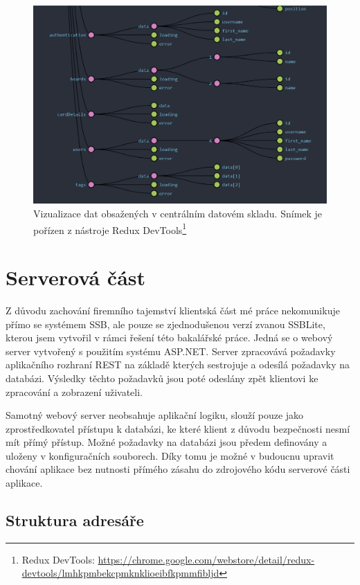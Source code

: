 \begin{figure}[H]
	\centering
	\label{img:ngrx-devtools}
	\includegraphics[width=\textwidth]{obrazky-figures/ngrx-chart.png}
	\caption{Vizualizace dat obsažených v centrálním datovém skladu. Snímek je pořízen z nástroje Redux DevTools\footnote{Redux DevTools: \url{https://chrome.google.com/webstore/detail/redux-devtools/lmhkpmbekcpmknklioeibfkpmmfibljd}}}
\end{figure}



\section{Serverová část}
Z důvodu zachování firemního tajemství klientská část mé práce nekomunikuje přímo se systémem SSB, ale pouze se zjednodušenou verzí zvanou SSBLite, kterou jsem vytvořil v rámci řešení této bakalářské práce. Jedná se o webový server vytvořený s použitím systému ASP.NET. Server zpracovává požadavky aplikačního rozhraní REST na základě kterých sestrojuje a odesílá požadavky na databázi. Výsledky těchto požadavků jsou poté odeslány zpět klientovi ke zpracování a zobrazení uživateli.

Samotný webový server neobsahuje aplikační logiku, slouží pouze jako zprostředkovatel přístupu k databázi, ke které klient z důvodu bezpečnosti nesmí mít přímý přístup. Možné požadavky na databázi jsou předem definovány a uloženy v konfiguračních souborech. Díky tomu je možné v budoucnu upravit chování aplikace bez nutnosti přímého zásahu do zdrojového kódu serverové části aplikace. 


\subsection{Struktura adresáře}
\blindtext

